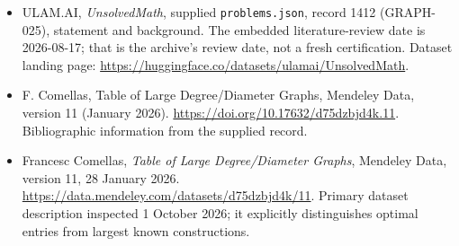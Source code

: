 \documentclass[11pt,a4paper]{article}
\begin{document}
{\small

\begin{itemize}

\item[\hypertarget{source:1412:1}{S1}] ULAM.AI, \emph{UnsolvedMath}, supplied \texttt{problems.json}, record 1412 (GRAPH-025), statement and background. The embedded literature-review date is 2026-08-17; that is the archive’s review date, not a fresh certification. Dataset landing page: \url{https://huggingface.co/datasets/ulamai/UnsolvedMath}.

\item[\hypertarget{source:1412:2}{S2}] F. Comellas, Table of Large Degree/Diameter Graphs, Mendeley Data, version 11 (January 2026). \url{https://doi.org/10.17632/d75dzbjd4k.11}. Bibliographic information from the supplied record.


\item[E1] Francesc Comellas, \emph{Table of Large
Degree/Diameter Graphs}, Mendeley Data, version 11, 28 January 2026.
\url{https://data.mendeley.com/datasets/d75dzbjd4k/11}.
Primary dataset description inspected 1 October 2026; it explicitly
distinguishes optimal entries from largest known constructions.

\end{itemize}

}

\label{end:1412}
\end{document}
